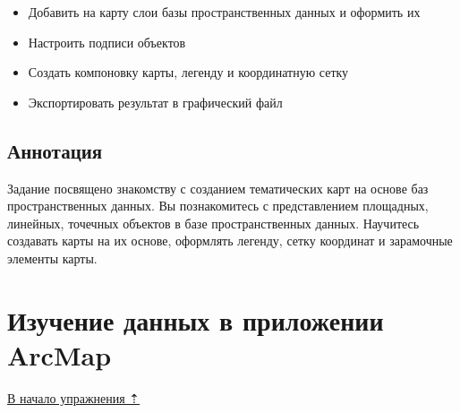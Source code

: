 \documentclass[]{book}
\providecommand{\tightlist}{%
  \setlength{\itemsep}{0pt}\setlength{\parskip}{0pt}}
\theoremstyle{definition}
\theoremstyle{definition}
\theoremstyle{definition}
\theoremstyle{remark}
\begin{document}
\begin{itemize}
\tightlist
\item
  Добавить на карту слои базы пространственных данных и оформить их
\item
  Настроить подписи объектов
\item
  Создать компоновку карты, легенду и координатную сетку
\item
  Экспортировать результат в графический файл
\end{itemize}

\hypertarget{map-design-quaternary-annotation}{%
\subsection{Аннотация}\label{map-design-quaternary-annotation}}

Задание посвящено знакомству с созданием тематических карт на основе баз
пространственных данных. Вы познакомитесь с представлением площадных,
линейных, точечных объектов в базе пространственных данных. Научитесь
создавать карты на их основе, оформлять легенду, сетку координат и
зарамочные элементы карты.

\hypertarget{map-design-quaternary-data}{%
\section{Изучение данных в приложении
ArcMap}\label{map-design-quaternary-data}}

\protect\hyperlink{map-design-quaternary}{В начало упражнения ⇡}
\end{document}
